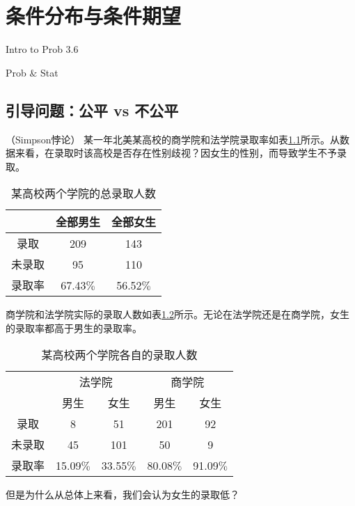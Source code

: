 \chapter{条件分布与条件期望}
\begin{introduction}
  \item Intro to Prob 3.6
  \item Prob $\&$ Stat
\end{introduction}
\section{引导问题：公平 vs 不公平}
\begin{example}{（Simpson悖论）}
某一年北美某高校的商学院和法学院录取率如表\ref{tab:lect10_1}所示。从数据来看，在录取时该高校是否存在性别歧视？因女生的性别，而导致学生不予录取。
\begin{table}[ht]
  \caption{某高校两个学院的总录取人数\label{tab:lect10_1}}
  \centering
  \begin{tabular}{ccc}
  \toprule
    & {全部男生} 
    & {全部女生} \\
\midrule
    录取 & 209
    & 143
     \\
    未录取      & 95
    & 110
    \\
    录取率& 67.43$\%$
    & 56.52$\%$
    \\
  \bottomrule
  \end{tabular}
\end{table}

商学院和法学院实际的录取人数如表\ref{tab:lect10_2}所示。无论在法学院还是在商学院，女生的录取率都高于男生的录取率。
\begin{table}[ht]
  \caption{某高校两个学院各自的录取人数\label{tab:lect10_2}}
  \centering
  \begin{tabular}{ccccc}
  \toprule
  & \multicolumn{2}{c}{法学院} &  \multicolumn{2}{c}{商学院}\\
  \cline{2-3}\cline{4-5}
    & 男生 
    & 女生
    & 男生
    &女生\\
\midrule
    录取 & 8
    & 51
    & 201
    & 92
     \\
    未录取      & 45
    & 101
    & 50
    & 9
     \\
    录取率& 15.09$\%$
    & 33.55$\%$
    & 80.08$\%$
    & 91.09$\%$
    \\
  \bottomrule
  \end{tabular}
\end{table}
\end{example}
\begin{problem}
但是为什么从总体上来看，我们会认为女生的录取低？
\end{problem}
\begin{note}
\vspace{5cm}
\end{note}

